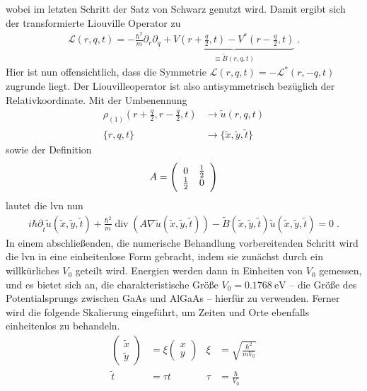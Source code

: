 wobei im letzten Schritt der Satz von Schwarz genutzt wird. Damit ergibt sich der transformierte Liouville Operator zu
\begin{align}
  \mathcal{L}(r,q,t) = -\frac{\hbar^2}{m} \partial_r\partial_q + \underbrace{V\left(r+\frac{q}{2},t\right) - V^*\left(r-\frac{q}{2},t\right)}_{\equiv \tilde{B}(r,q,t)} \; .
  \label{eq:Liouvilleoperator}
\end{align}
Hier ist nun offensichtlich, dass die Symmetrie $\mathcal{L}(r,q,t)=-\mathcal{L}^*(r,-q,t)$ zugrunde liegt. Der Liouvilleoperator ist also antisymmetrisch bezüglich der Relativkoordinate. Mit der Umbenennung
\begin{align*}
  \rho_{(1)}\left(r+\frac{q}{2}, r-\frac{q}{2}, t\right) &\longrightarrow \tilde{u}(r,q,t) \\
  \{ r, q, t\} &\longrightarrow \{\tilde{x}, \tilde{y}, \tilde{t}\}
\end{align*}
sowie der Definition
\begin{align*}
  A = \left(\begin{array}{c c} 0 & \frac{1}{2} \\ \frac{1}{2} & 0 \end{array} \right)
\end{align*}
lautet die \ac{lvn} nun
\begin{align*}
  i\hbar\partial_{\tilde{t}} \tilde{u}(\tilde{x},\tilde{y},\tilde{t})+\frac{\hbar^2}{m}\operatorname{div}(A\nabla \tilde{u}(\tilde{x},\tilde{y},\tilde{t})) -  \tilde{B}(\tilde{x},\tilde{y},\tilde{t}) \tilde{u}(\tilde{x},\tilde{y},\tilde{t}) = 0 \; .
\end{align*}
In einem abschließenden, die numerische Behandlung vorbereitenden Schritt wird die \ac{lvn} in eine einheitenlose Form gebracht, indem sie zunächst durch ein willkürliches $V_0$ geteilt wird. Energien werden dann in Einheiten von $V_0$ gemessen, und es bietet sich an, die charakteristische Größe $V_0 = \SI{0.1768}{\electronvolt}$ -- die Größe des Potentialsprungs zwischen GaAs und AlGaAs  -- hierfür zu verwenden.
Ferner wird die folgende Skalierung eingeführt, um Zeiten und Orte ebenfalls einheitenlos zu behandeln.
\begin{align*}
  \left(\begin{array}{c}\tilde{x}\\\tilde{y}\end{array}\right) &= \xi \left(\begin{array}{c}x\\y\end{array}\right)   & \xi &= \sqrt{\frac{\hbar^2}{mV_0}} \\
  \tilde{t} &= \tau t   & \tau &= \frac{\hbar}{V_0}
\end{align*}
